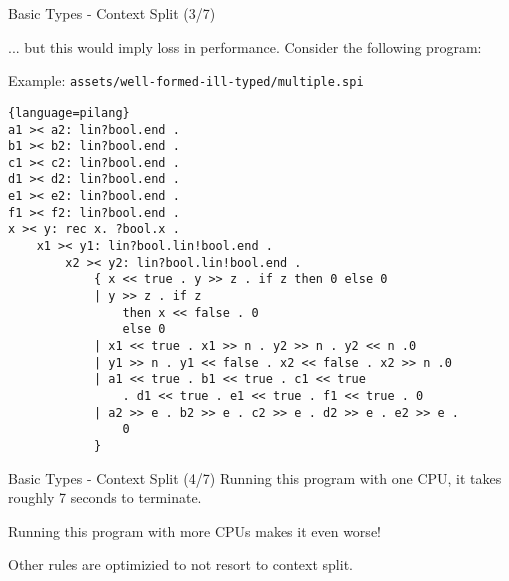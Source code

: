 \begin{frame}[fragile]{Basic Types - Context Split (3/7)}
    
    ... but this would imply loss in performance. Consider the following program:
    \begin{exampleblock}{Example: \texttt{assets/well-formed-ill-typed/multiple.spi}}
\tiny\begin{lstlisting}{language=pilang}
a1 >< a2: lin?bool.end .
b1 >< b2: lin?bool.end .
c1 >< c2: lin?bool.end .
d1 >< d2: lin?bool.end .
e1 >< e2: lin?bool.end .
f1 >< f2: lin?bool.end .
x >< y: rec x. ?bool.x .
    x1 >< y1: lin?bool.lin!bool.end .
        x2 >< y2: lin?bool.lin!bool.end .
            { x << true . y >> z . if z then 0 else 0
            | y >> z . if z
                then x << false . 0
                else 0
            | x1 << true . x1 >> n . y2 >> n . y2 << n .0
            | y1 >> n . y1 << false . x2 << false . x2 >> n .0
            | a1 << true . b1 << true . c1 << true 
                . d1 << true . e1 << true . f1 << true . 0
            | a2 >> e . b2 >> e . c2 >> e . d2 >> e . e2 >> e . 
                0
            }
        \end{lstlisting}
    \end{exampleblock}
\end{frame}

\begin{frame}{Basic Types - Context Split (4/7)}
    Running this program with one CPU, it takes roughly 7 seconds to terminate.
    \vspace{0.5cm}

    Running this program with more CPUs makes it even worse!

    \vspace{0.5cm}

    Other rules are optimizied to not resort to context split.
\end{frame}

